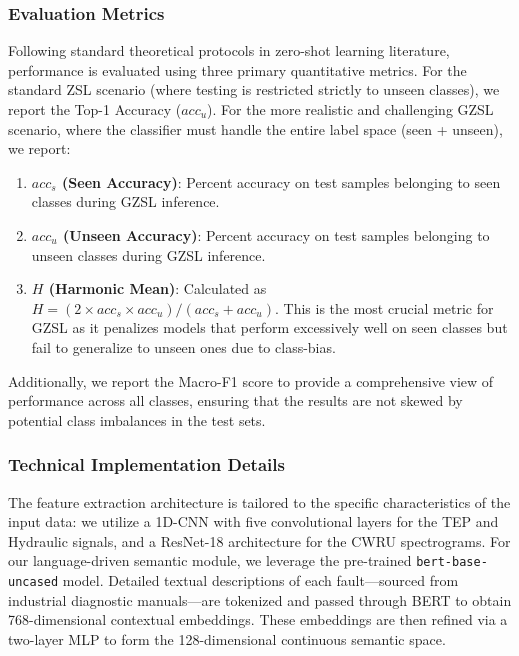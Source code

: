 \subsubsection{Evaluation Metrics}
Following standard theoretical protocols in zero-shot learning literature, performance is evaluated using three primary quantitative metrics. For the standard ZSL scenario (where testing is restricted strictly to unseen classes), we report the Top-1 Accuracy ($acc_u$). For the more realistic and challenging GZSL scenario, where the classifier must handle the entire label space (seen + unseen), we report:
\begin{enumerate}
    \item \textbf{$acc_s$ (Seen Accuracy)}: Percent accuracy on test samples belonging to seen classes during GZSL inference.
    \item \textbf{$acc_u$ (Unseen Accuracy)}: Percent accuracy on test samples belonging to unseen classes during GZSL inference.
    \item \textbf{$H$ (Harmonic Mean)}: Calculated as $H = (2 \times acc_s \times acc_u) / (acc_s + acc_u)$. This is the most crucial metric for GZSL as it penalizes models that perform excessively well on seen classes but fail to generalize to unseen ones due to class-bias.
\end{enumerate}
Additionally, we report the Macro-F1 score to provide a comprehensive view of performance across all classes, ensuring that the results are not skewed by potential class imbalances in the test sets.

\subsubsection{Technical Implementation Details}
The feature extraction architecture is tailored to the specific characteristics of the input data: we utilize a 1D-CNN with five convolutional layers for the TEP and Hydraulic signals, and a ResNet-18 architecture for the CWRU spectrograms. For our language-driven semantic module, we leverage the pre-trained \texttt{bert-base-uncased} model. Detailed textual descriptions of each fault—sourced from industrial diagnostic manuals—are tokenized and passed through BERT to obtain 768-dimensional contextual embeddings. These embeddings are then refined via a two-layer MLP to form the 128-dimensional continuous semantic space.

